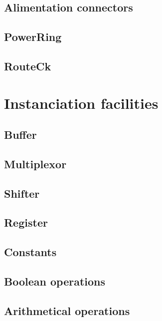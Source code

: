 \documentclass[11pt]{article}
\begin{document}
    \subsection{Alimentation connectors}
    \label{secconnectors}
    
    \subsection{PowerRing}
    \label{secpowerring}
    
    \subsection{RouteCk}
    \label{secrouteck}
    

\section{Instanciation facilities}
\label{secfacilities}

    \subsection{Buffer}
    \label{secbuff}
    
    \subsection{Multiplexor}
    \label{secmux}
    
    \subsection{Shifter}
    \label{secshift}
    
    \subsection{Register}
    \label{secreg}
        
    \subsection{Constants}
    \label{secconstant}
        
    \subsection{Boolean operations}
    \label{secbool}
    
    \subsection{Arithmetical operations}
    \label{secarithmetic}
    
\end{document}
